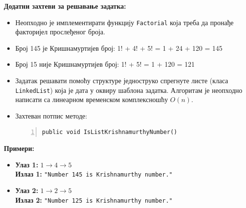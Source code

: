 \textbf{Додатни захтеви за решавање задатка:}
\begin{itemize}
    \item Неопходно је имплементирати функцију \texttt{Factorial} која треба да пронађе факторијел прослеђеног броја.
    \item Број 145 је Кришнамуртијев број: 1! + 4! + 5! = 1 + 24 + 120 = 145
    \item Број 15 није Кришнамуртијев број: 1! + 5! = 1 + 120 = 121
    \item Задатак решавати помоћу структуре једноструко спрегнуте листе (класа \texttt{LinkedList}) која је дата у оквиру шаблона задатка. Алгоритам је неопходно написати са линеарном временском комплексношћу $O(n)$.
    \item Захтеван потпис методе:
    \begin{Verbatim}[fontsize=\footnotesize, numbers=left, xleftmargin=10mm]
public void IsListKrishnamurthyNumber()
    \end{Verbatim}
\end{itemize}

\textbf{Примери:}
\begin{itemize}
    \item \textbf{Улаз 1:} $1 \rightarrow 4 \rightarrow 5$ \\
          \textbf{Излаз 1:} \texttt{"Number 145 is Krishnamurthy number."}
    \item \textbf{Улаз 2:} $1 \rightarrow 2 \rightarrow 5$ \\
          \textbf{Излаз 2:} \texttt{"Number 125 is Krishnamurthy number."}
\end{itemize}

